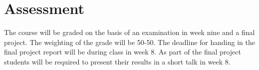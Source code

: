 \section{Assessment}

The course will be graded on the basis of an examination in week nine and a final project.  The weighting of the grade will be 50-50.  The deadline for handing in the final project report will be during class in week 8.  As part of the final project students will be required to present their results in a short talk in week 8.
